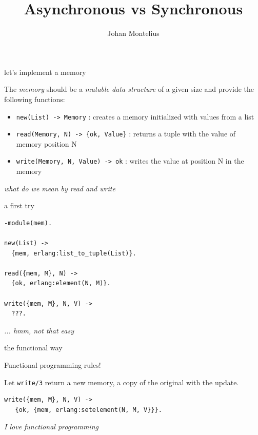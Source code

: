 

\title[ID1019 Asynchronous]{Asynchronous vs Synchronous}


\author{Johan Montelius}
\date{\semester}



\begin{frame}
\titlepage
\end{frame}

\begin{frame}{let's implement a memory}

The {\em memory} should be a {\em mutable data structure} of a given size and provide the following functions:

\pause\vspace{20pt}

\begin{itemize}
 \item {\tt new(List) -> Memory} : creates a memory initialized with values from a list
 \item {\tt read(Memory, N) -> \{ok, Value\}} : returns a tuple with the value of memory position N
 \item {\tt write(Memory, N, Value) -> ok} : writes the value at position N in the memory
\end{itemize}

\pause\vspace{20pt}
{\em what do we mean by read and write}

\end{frame}

\begin{frame}[fragile]{a first try}

\begin{verbatim}
-module(mem).

new(List) -> 
  {mem, erlang:list_to_tuple(List)}.

read({mem, M}, N) ->
  {ok, erlang:element(N, M)}.

write({mem, M}, N, V) ->
  ???.
\end{verbatim}

\pause\vspace{20pt}
{\em ... hmm, not that easy}

\end{frame}

\begin{frame}[fragile]{the functional way}

Functional programming rules!

\pause\vspace{10pt}
Let {\tt write/3} return a new memory, a copy of the original with the update.

\pause\vspace{10pt}
\begin{verbatim}
write({mem, M}, N, V) ->
   {ok, {mem, erlang:setelement(N, M, V}}}.
\end{verbatim}
\pause\vspace{10pt}

{\em I love functional programming}

\end{frame}

